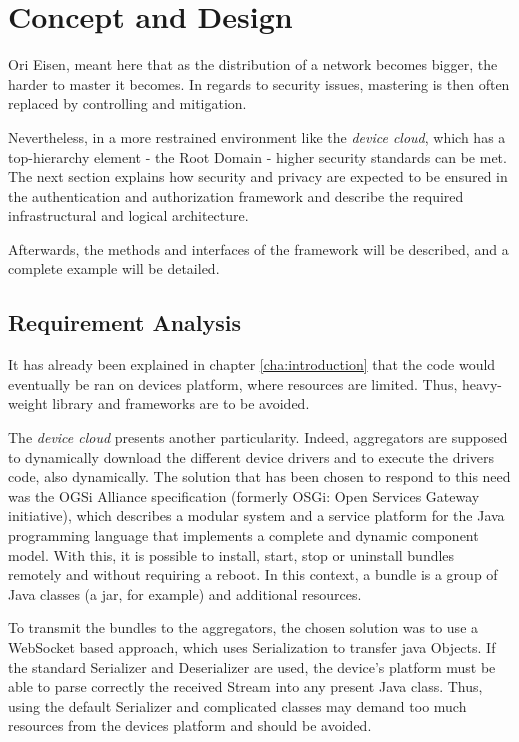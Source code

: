 \chapter{Concept and Design}
\label{cha:03:design_concept}


Ori Eisen, meant here that as the distribution of a network becomes bigger, the harder to master it becomes. In regards to security issues, mastering is then often replaced by controlling and mitigation. 

Nevertheless, in a more restrained environment like the \emph{device cloud}, which has a top-hierarchy element - the Root Domain - higher security standards can be met. The next section explains how security and privacy are expected to be ensured in the authentication and authorization framework and describe the required infrastructural and logical architecture.

Afterwards, the methods and interfaces of the framework will be described, and a complete example will be detailed.

\section{Requirement Analysis}
It has already been explained in chapter \ref{cha:introduction} that the code would eventually be ran on devices platform, where resources are limited. Thus, heavy-weight library and frameworks are to be avoided.

The \emph{device cloud} presents another particularity. Indeed, aggregators are supposed to dynamically download the different device drivers and to execute the drivers code, also dynamically. The solution that has been chosen to respond to this need was the OGSi Alliance specification (formerly OSGi: Open Services Gateway initiative), which describes a modular system and a service platform for the Java programming language that implements a complete and dynamic component model. With this, it is possible to install, start, stop or uninstall bundles remotely and without requiring a reboot. In this context, a bundle is a group of Java classes (a jar, for example) and additional resources.

To transmit the bundles to the aggregators, the chosen solution was to use a WebSocket based approach, which uses Serialization to transfer java Objects. If the standard Serializer and Deserializer are used, the device's platform must be able to parse correctly the received Stream into any present Java class. Thus, using the default Serializer and complicated classes may demand too much resources from the devices platform and should be avoided.

